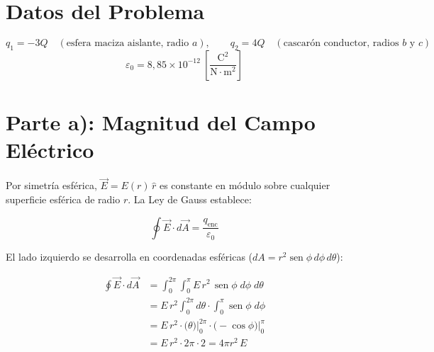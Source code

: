 \documentclass[12pt,letterpaper]{article}
\begin{document}
\begin{center}
\end{center}

\section*{Datos del Problema}

\[
    q_1 = -3Q \quad (\text{esfera maciza aislante, radio }a),
    \qquad
    q_2 = 4Q \quad (\text{cascar\'on conductor, radios }b\text{ y }c)
\]
\[
    \varepsilon_0 = 8{,}85 \times 10^{-12}
    \ \left[\frac{\text{C}^2}{\text{N}\cdot\text{m}^2}\right]
\]

\section*{Parte a): Magnitud del Campo El\'ectrico}

Por simetr\'ia esf\'erica, $\vec{E} = E(r)\,\hat{r}$ es constante en m\'odulo sobre cualquier
superficie esf\'erica de radio $r$. La Ley de Gauss establece:

\[
    \oint \vec{E}\cdot d\vec{A} = \frac{q_\text{enc}}{\varepsilon_0}
\]

El lado izquierdo se desarrolla en coordenadas esf\'ericas
($dA = r^2\operatorname{sen}\phi\,d\phi\,d\theta$):

\begin{align*}
    \oint \vec{E}\cdot d\vec{A}
        &= \int_0^{2\pi}\!\int_0^{\pi}
           E\,r^2\,\operatorname{sen}\phi\;d\phi\;d\theta \\[4pt]
        &= E\,r^2
           \int_0^{2\pi}\!d\theta
           \cdot
           \int_0^{\pi}\operatorname{sen}\phi\;d\phi \\[4pt]
        &= E\,r^2
           \cdot \bigl(\theta\bigr)\big|_0^{2\pi}
           \cdot \bigl(-\cos\phi\bigr)\big|_0^{\pi} \\[4pt]
        &= E\,r^2 \cdot 2\pi \cdot 2
         = 4\pi r^2\,E
\end{align*}
\end{document}
